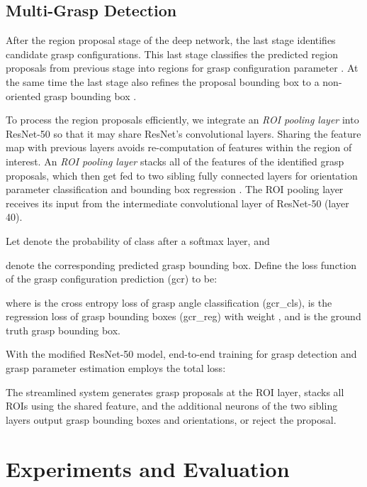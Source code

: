 \documentclass[letterpaper, 10 pt, journal, twoside]{IEEEtran}
\begin{document}
\subsection{Multi-Grasp Detection}
After the region proposal stage of the deep network, the last stage
identifies candidate grasp configurations. This last stage classifies the
predicted region proposals from previous stage into  regions for grasp
configuration parameter . At the same time the last stage also
refines the proposal bounding box to a non-oriented grasp bounding box
. 



To process the region proposals efficiently, we integrate an
\emph{ROI pooling layer} \cite{girshick2015fast} into ResNet-50 so that it
may share ResNet's convolutional layers.  Sharing the feature map with
previous layers avoids re-computation of features within the region of
interest. An \emph{ROI pooling layer} stacks all of the features of the
identified grasp proposals, which then get fed to two sibling fully
connected layers for orientation parameter classification  and bounding
box regression . The ROI pooling layer receives its input from
the intermediate convolutional layer of ResNet-50 (layer 40). 

Let  denote the probability of class  after a softmax layer, and

denote the corresponding predicted grasp bounding box. Define the loss
function of the grasp configuration prediction (gcr) to be:

where  is the cross entropy loss of grasp angle classification
(gcr\_cls),  is the  regression loss of grasp bounding boxes (gcr\_reg) with weight , and  is the ground truth grasp bounding box.


With the modified ResNet-50 model, end-to-end training for grasp detection
and grasp parameter estimation employs the total loss: 

The streamlined system generates grasp proposals at the ROI layer,
stacks all ROIs using the shared feature, and the additional neurons of the
two sibling layers output grasp bounding boxes and orientations, or reject
the proposal. 
 
\section{Experiments and Evaluation}
\end{document}
